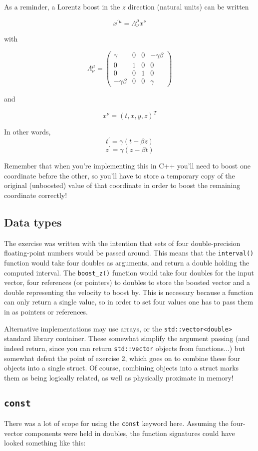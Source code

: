 \documentclass[a4paper]{scrartcl}
\begin{document}
As a reminder, a Lorentz boost in the $z$ direction (natural units) can be written

\[ x^{\prime\mu} = \Lambda^\mu_\nu x^\nu \]

with

\[ \Lambda^\mu_\nu = \left( \begin{array}{cccc} \gamma & 0 & 0 & -\gamma\beta \\ 0 & 1 & 0 & 0 \\ 0 & 0 & 1 & 0 \\ -\gamma\beta & 0 & 0 & \gamma \end{array} \right) \]

and

\[ x^\nu = (t,x,y,z)^T \]

In other words,
\[ t^\prime = \gamma(t - \beta z) \]
\[ z^\prime = \gamma(z - \beta t) \]

Remember that when you're implementing this in C++ you'll need to boost one coordinate before the other, so you'll have to store a temporary copy of the original (unboosted) value of that coordinate in order to boost the remaining coordinate correctly!

\subsection{Data types}
The exercise was written with the intention that sets of four double-precision floating-point numbers would be passed around. This means that the \verb|interval()| function would take four doubles as arguments, and return a double holding the computed interval. The \verb|boost_z()| function would take four doubles for the input vector, four references (or pointers) to doubles to store the boosted vector and a double representing the velocity to boost by. This is necessary because a function can only return a single value, so in order to set four values one has to pass them in as pointers or references.

Alternative implementations may use arrays, or the \verb|std::vector<double>| standard library container. These somewhat simplify the argument passing (and indeed return, since you can return \verb|std::vector| objects from functions...) but somewhat defeat the point of exercise 2, which goes on to combine these four objects into a single struct. Of course, combining objects into a struct marks them as being logically related, as well as physically proximate in memory!

\subsection{\texttt{const}}
There was a lot of scope for using the \verb|const| keyword here. Assuming the four-vector components were held in doubles, the function signatures could have looked something like this:
\end{document}

